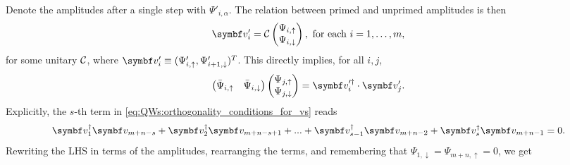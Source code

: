 Denote the amplitudes after a single step with $\Psi'_{i,\alpha}$.
The relation between primed and unprimed amplitudes is then
\begin{equation}
	\bs v_i^\prime
	= \mathcal C
	\begin{pmatrix}
		\Psi_{i,\uparrow} \\ \Psi_{i, \downarrow}
	\end{pmatrix},
	\text{ for each }
	i = 1, \dots, m,
\end{equation}
for some unitary ${\mathcal{C}}$,
where $\bs v'_i \equiv (\Psi_{i,\uparrow}',\Psi_{i+1,\downarrow}')^T$.
This directly implies, for all $i, j$,
\begin{equation}
	\begin{pmatrix}
		\bar\Psi_{i, \uparrow} & \bar\Psi_{i, \downarrow}
	\end{pmatrix}
	\begin{pmatrix}
		\Psi_{j, \uparrow} \\ \Psi_{j, \downarrow}
	\end{pmatrix}
	=
	\bs v^{\prime\dagger}_{i} \cdot \bs v^\prime_j.
    \label{eq:QWs:transition_us_to_vprimes}
\end{equation}
Explicitly, the $s$-th term in \cref{eq:QWs:orthogonality_conditions_for_vs} reads
\begin{equation}
	\bs v_1^\dagger \bs v_{m+n-s}
	+ \bs v_2^\dagger \bs v_{m+n-s+1}
	+ ...
	+ \bs v_{s-1}^\dagger \bs v_{m+n-2}
    + \bs v_s^\dagger \bs v_{m+n-1} = 0.
\end{equation}
Rewriting the LHS in terms of the amplitudes, rearranging the terms, and remembering that $\Psi_{1, \downarrow} = \Psi_{m+n, \uparrow} = 0$, we get
